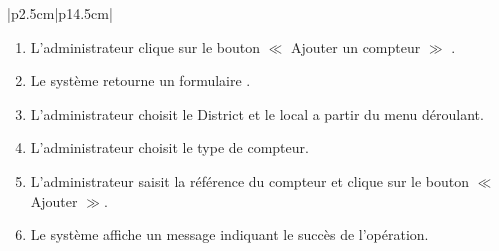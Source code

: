 \documentclass[11pt]{report}
\begin{document}
\begin{table}[h]
\begin{tabular}{|p{2.5cm}|p{14.5cm}|}
{\begin{enumerate}
      \item \begin{Large} L'administrateur clique sur le bouton $\ll$ Ajouter un compteur $\gg$ .\end{Large}
      \item \begin{Large} Le système retourne un formulaire  .\end{Large}
      \item \begin{Large} L'administrateur choisit le District et le local a partir du menu déroulant.\end{Large}
      \item \begin{Large} L'administrateur choisit  le type de compteur.\end{Large}
      \item \begin{Large} L'administrateur saisit la référence du compteur et clique sur le bouton $\ll$ Ajouter $\gg$.\end{Large}
      \item \begin{Large} Le système affiche un message indiquant le succès de l'opération.\end{Large}
      
   \end{enumerate}} \\
   \hline
    \\
   \hline
    \\
   \hline
\end{tabular}
\caption{Description textuelle du cas d'utilisation $\ll$ Ajouter un compteur $\gg$}
\end{table}
\end{document}
